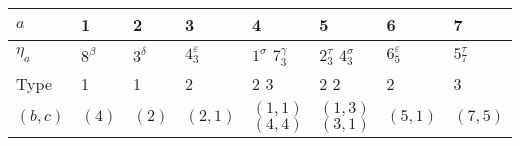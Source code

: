 \documentclass[a4paper,12pt]{report}
\begin{document}
\begin{center}
\begin{tabular}{|l|l|l|l|l|l|l|l|}\hline
\hspace{1mm} $a$  & \hspace{1mm} 1                 & \hspace{1mm} 2           & \hspace{2mm} 3 & \hspace{9mm}
4                                         & \hspace{9mm} 5                                           &
\hspace{2mm} 6        & \hspace{2mm} 7 \\ \hline \hspace{1mm} $\eta_{a}$ & \hspace{1mm} $8^{\beta}$ &\hspace{1mm}
$3^{\delta}$ &\hspace{2mm} $4_{3}^{\varepsilon}$ &\hspace{2mm} $1^{\sigma}$ \hspace{6mm} $7_{3}^{\gamma}$
&\hspace{2mm} $2_{3}^{\tau}$ \hspace{6mm} $4_{3}^{\sigma}$ & \hspace{2mm} $6_{5}^{\varepsilon}$ & \hspace{2mm}
$5_{7}^{\tau}$ \\ \hline Type                    & \hspace{1mm} 1            & \hspace{1mm} 1 &\hspace{2mm}
2                     & \hspace{2mm} 2           \hspace{8mm} 3                &\hspace{2mm} 2 \hspace{8mm}
2                             & \hspace{2mm} 2        & \hspace{2mm} 3 \\ \hline
 $(b,c)$ & $(4)$                       & $(2)$       & $(2,1)$                           & $(1,1)$                  \hspace{1mm} $(4,4)$          & $(1,3)$ \hspace{1mm} $(3,1)$                             & $(5,1)$               & $(7,5)$        \\ \hline

\end{tabular}
\end{center}
\end{document}
